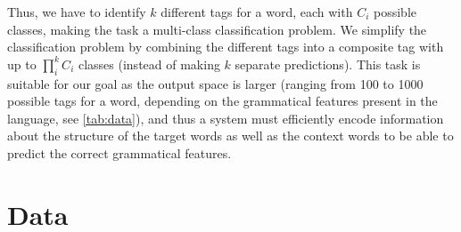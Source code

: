 \documentclass[11pt]{article}
\begin{document}

            Thus, we have to identify $k$ different tags for a word,
     each with $C_i$ possible classes, making the task a multi-class
     classification problem. We simplify the classification problem by
     combining the different tags into a composite tag with up to
     $\prod _i^k C_i$ classes (instead of making $k$ separate
     predictions).
                    This task is suitable for our goal as the output
     space is larger (ranging from 100 to 1000 possible tags for a
     word, depending on the grammatical features present in the
     language, see \cref{tab:data}), and thus a system must
     efficiently encode information about the structure of the target
     words as well as the context words to be able to predict the
     correct grammatical features.
    
    \section{Data}
    
\end{document}
